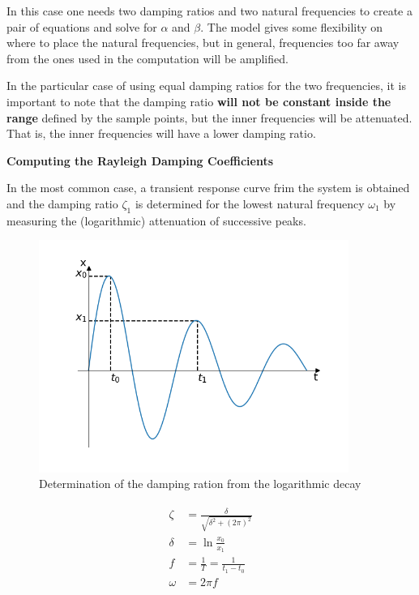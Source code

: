\documentclass[10pt,b5paper,titlepage]{book}
\newenvironment{ematrix}
{
    \begin{eqnarray}
        \begin{aligned}
}
{
        \end{aligned}
    \end{eqnarray}
}
\begin{document}
In this case one needs two damping ratios and two natural frequencies to create
a pair of equations and solve for $ \alpha $ and $ \beta $. The model gives some
flexibility on where to place the natural frequencies, but in general, frequencies
too far away from the ones used in the computation will be amplified.

In the particular case of using equal damping ratios for the two frequencies,
it is important to note that the damping ratio \textbf{will not be constant inside the range}
defined by the sample points, but the inner frequencies will be attenuated. That is,
the inner frequencies will have a lower damping ratio.

\textbf{Computing the Rayleigh Damping Coefficients}

In the most common case, a transient response curve frim the system is obtained and
the damping ratio $ \zeta_1 $ is determined for the lowest natural frequency
$ \omega_1 $ by measuring the (logarithmic) attenuation of successive peaks.

\begin{figure}[ht]
    \centering
    \includegraphics[width=0.90\textwidth]{img/Logarithmic_Decay_Damping_Ratio.png}
    \caption{Determination of the damping ration from the logarithmic decay}
    \label{fig:logarithmic-decay-damping-ratio-png}
\end{figure}

\begin{ematrix}
    \zeta &= \frac{\delta}{\sqrt{\delta^2 + (2 \pi)^2}}\\
    \delta &= \ln{\frac{x_0}{x_1}}\\
    f &= \frac{1}{T} = \frac{1}{t_1 - t_0}\\
    \omega &= 2 \pi f
\end{ematrix}
\end{document}
